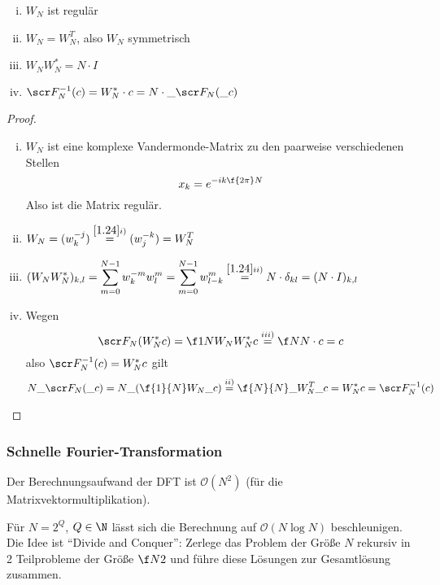\documentclass[a4paper,11pt]{scrartcl}
\begin{document}
\begin{lem}[Eigenschaften] \label{1.27}
	\begin{enumerate}[i)]
		\item
			$\displaystyle W_N$ ist regulär
		\item
			$\displaystyle W_N = W_N^T$, also $W_N$ symmetrisch
		\item
			$\displaystyle W_NW_N^{*} = N\cdot I$
		\item
			$\displaystyle \scr F_N^{-1}(c) = W^*_N\cdot c = N \cdot \_{\scr F_N(\_c)}$
	\end{enumerate}
	\begin{proof}
		\begin{enumerate}[i)]
			\item
				$W_N$ ist eine komplexe Vandermonde-Matrix zu den paarweise verschiedenen Stellen
				\[
					x_k = e^{-ik\f {2\pi}N}
				\]
				Also ist die Matrix regulär.
			\item
				$\displaystyle W_N = (w_k^{-j}) \stackrel{\ref{1.24} i)}=  (w_j^{-k}) = W_N^T$
			\item
				$\displaystyle (W_NW_N^*)_{k,l} = \sum_{m=0}^{N-1} w_k^{-m}w_l^m = \sum_{m=0}^{N-1} w_{l-k}^m \stackrel{\ref{1.24} ii)}= N\cdot \delta_{kl} = (N\cdot I)_{k,l}$
			\item
				Wegen
				\[
					\scr F_N (W_N^* c) = \f 1N W_N W_N^* c \stackrel{iii)}= \f N N \cdot c = c
				\]
				also $\scr F_N^{-1} (c) = W_N^* c$ gilt
				\[
					N \_{\scr F_N(\_c)}
					= N \_{\left(\f {1}{N} W_N \_c\right)} 
					\stackrel{ii)}= \f{N}{N} \_{W_N^T \_c} 
					= W_N^* c 
					= \scr F_N^{-1}(c)
				\]
		\end{enumerate}
	\end{proof}
\end{lem}


\subsubsection{Schnelle Fourier-Transformation}

Der Berechnungsaufwand der DFT ist $\mathcal O(N^2)$ (für die Matrixvektormultiplikation).

Für $N=2^Q$, $Q\in \N$ lässt sich die Berechnung auf $\mathcal O(N\log N)$ beschleunigen.
Die Idee ist “Divide and Conquer”: Zerlege das Problem der Größe $N$ rekursiv in 2 Teilprobleme der Größe $\f N2$ und führe diese Lösungen zur Gesamtlösung zusammen.
\end{document}
